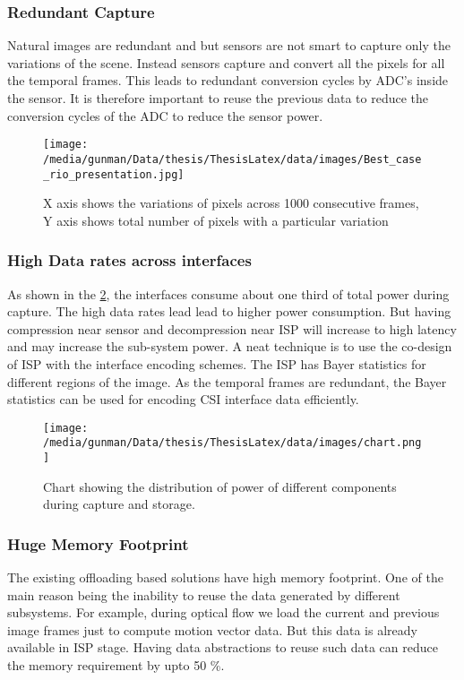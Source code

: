 \subsubsection{Redundant Capture}
Natural images are redundant and but sensors are not smart to capture only the variations of the scene. Instead sensors capture and convert all the pixels for all the temporal frames. This leads to redundant conversion cycles by ADC's inside the sensor. It is therefore important to reuse the previous data to reduce the conversion cycles of the ADC to reduce the sensor power. 
\begin{figure}[h]
	\begin{center}
		\texttt{[image: /media/gunman/Data/thesis/ThesisLatex/data/images/Best\_case\_rio\_presentation.jpg]}
	\end{center}
	\caption{X axis shows the variations of pixels across 1000 consecutive frames, Y axis shows total number of pixels with a particular variation}	
	\label{fig:sensorRedundancy}
\end{figure} 

\subsubsection{High Data rates across interfaces}
As shown in the \ref{fig:pieCapPow}, the interfaces consume about one third of total power during capture. The high data rates lead lead to higher power consumption. But having compression near sensor and decompression near ISP will increase to high latency and may increase the sub-system power. A neat technique is to use the co-design of ISP with the interface encoding schemes. The ISP has Bayer statistics for different regions of the image. As the temporal frames are redundant, the Bayer statistics can be used for encoding CSI interface data efficiently. 

\begin{figure}[h]
	\begin{center}
		\texttt{[image: /media/gunman/Data/thesis/ThesisLatex/data/images/chart.png]}
	\end{center}
	\caption{Chart showing the distribution of power of different components during capture and storage.}	
	\label{fig:pieCapPow}
\end{figure} 

\subsubsection{Huge Memory Footprint}
The existing offloading based solutions have high memory footprint. One of the main reason being the inability to reuse the data generated by different subsystems. For example, during optical flow we load the current and previous image frames just to compute motion vector data. But this data is already available in ISP stage. Having data abstractions to reuse such data can reduce the memory requirement by upto 50 \%.


